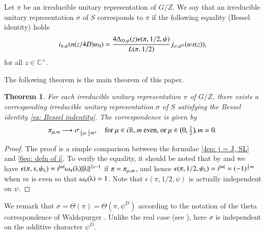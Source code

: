 \documentclass{amsproc}
\newcommand{\BC}{{\mathbb {C}}} \newcommand{\BD}{{\mathbb {D}}}
\def\BCx{\BC^{\times}}
\def\shskip{\hskip 0.5 pt}
\theoremstyle{plain}
\newtheorem{thm}{Theorem}[section] \newtheorem{cor}[thm]{Corollary}
\numberwithin{equation}{section}
\begin{document}
	
	\begin{defn}
	Let $\pi$ be an irreducible unitary representation of $G / Z$. We say that an irreducible unitary representation $\sigma$ of $S$ corresponds to $\pi$ if the following equality {\rm(}Bessel identity{\rm)} holds
	\begin{align}\label{eq: Bessel indentity}
	 i_{\pi, \shskip \psi} (n (z/ 4 D)\varw_0) = \frac {4 \Delta_{D,\shskip \psi} (z) \epsilon (\pi, 1/2, \psi)   } {L(\pi, 1/2)} j_{\sigma, \shskip \psi^D} (\varw s (z)),
	\end{align}
	for all $z \in \BCx$.
	\end{defn}


The following theorem is the main theorem of this paper.

\begin{thm}\label{thm: main}
	For each irreducible   unitary representation $\pi$ of $G / Z$, there exists a corresponding irreducible   unitary representation $\sigma $ of $S$ satisfying the Bessel identity \eqref{eq: Bessel indentity}. The correspondence is given by
	\begin{align*}
	\pi_{\mu, \shskip m}  \longrightarrow \sigma_{\frac 1 2 \mu, \shskip \frac 1 2 m}, \hskip 10 pt \text{for } \mu \in i \shskip \BR, m \text{ even, or } \mu \in \big( 0, \tfrac 1 2\big) \hskip -1 pt , m = 0.
	\end{align*}
\end{thm}

\begin{proof}
	The proof is a simple comparison between the formulae \eqref{4eq: j = J, SL} and \eqref{6eq: defn of i}. To verify the equality,  it should be noted that by \cite[(4.7)]{Knapp} and \cite[\S 3]{Tate} we have $\epsilon (\pi, s, \psi_{\lambdaup}) = i^{|m|} \omega_{\pi} (\lambdaup) \|\lambdaup\|^{2s -1}$ if $\pi = \pi_{\mu, \shskip  m}$, and hence $\epsilon (\pi, 1/2, \psi_{\lambdaup}) = i^{|m|} = (-1)^{\frac 1 2 m}$ when $m$ is even so that $\omega_{\pi} (\lambdaup) = 1$. Note that $\epsilon (\pi, 1/2, \psi)$ is actually independent on $\psi$.
\end{proof}

We remark that $ \sigma = \Theta (\pi) = \Theta (\pi , \psi^D)$ according to the notation of the theta correspondence of Waldspurger \cite{Waldspurger-Shimura}. Unlike the real case (see \cite[Theorem 19.2]{BaruchMao-Real}),  here $\sigma$    is independent on the additive character $\psi^D$. %
\end{document}
